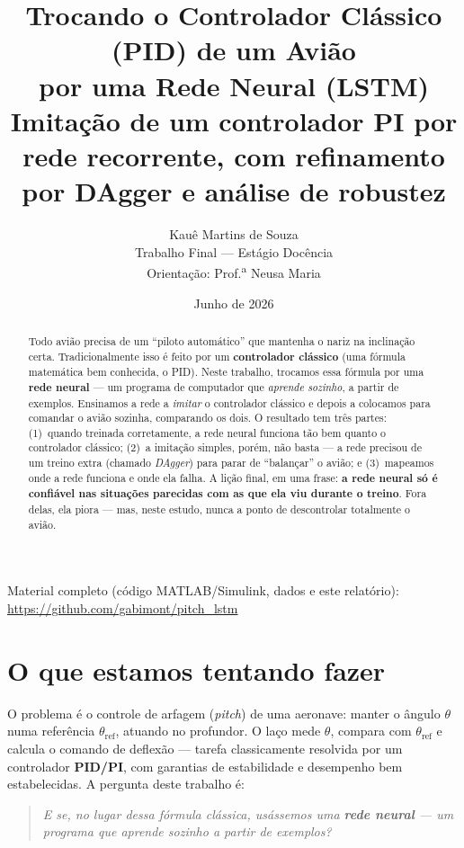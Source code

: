 \documentclass[11pt,a4paper]{article}
\title{\textbf{Trocando o Controlador Clássico (PID) de um Avião\\
por uma Rede Neural (LSTM)}\\[2mm]
\large Imitação de um controlador PI por rede recorrente, com refinamento por DAgger e
análise de robustez}
\author{Kauê Martins de Souza\\[1mm]
\small Trabalho Final --- Estágio Docência\\
\small Orientação: Prof.\textsuperscript{a} Neusa Maria}
\date{Junho de 2026}
\newcommand{\thetaref}{\theta_{\mathrm{ref}}}
\begin{document}
\maketitle

\begin{center}
\small Material completo (código MATLAB/Simulink, dados e este relatório):
\url{https://github.com/gabimont/pitch_lstm}
\end{center}

\begin{abstract}
\noindent Todo avião precisa de um ``piloto automático'' que mantenha o nariz na
inclinação certa. Tradicionalmente isso é feito por um \textbf{controlador clássico}
(uma fórmula matemática bem conhecida, o PID). Neste trabalho, trocamos essa fórmula
por uma \textbf{rede neural} --- um programa de computador que \emph{aprende sozinho},
a partir de exemplos. Ensinamos a rede a \emph{imitar} o controlador clássico e depois
a colocamos para comandar o avião sozinha, comparando os dois. O resultado tem três
partes: (1)~quando treinada corretamente, a rede neural funciona tão bem quanto o
controlador clássico; (2)~a imitação simples, porém, não basta --- a rede precisou de
um treino extra (chamado \emph{DAgger}) para parar de ``balançar'' o avião; e
(3)~mapeamos onde a rede funciona e onde ela falha. A lição final, em uma frase:
\textbf{a rede neural só é confiável nas situações parecidas com as que ela viu durante
o treino}. Fora delas, ela piora --- mas, neste estudo, nunca a ponto de descontrolar
totalmente o avião.
\end{abstract}

\tableofcontents
\newpage

\section{O que estamos tentando fazer}

O problema é o controle de arfagem (\emph{pitch}) de uma aeronave: manter o ângulo
$\theta$ numa referência $\thetaref$, atuando no profundor. O laço mede $\theta$,
compara com $\thetaref$ e calcula o comando de deflexão --- tarefa classicamente
resolvida por um controlador \textbf{PID/PI}, com garantias de estabilidade e
desempenho bem estabelecidas. A pergunta deste trabalho é:

\begin{quote}
\emph{E se, no lugar dessa fórmula clássica, usássemos uma \textbf{rede neural} ---
um programa que aprende sozinho a partir de exemplos?}
\end{quote}
\end{document}
